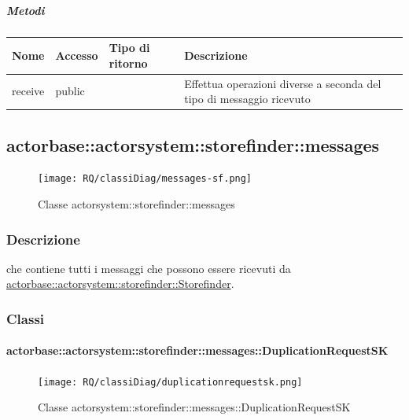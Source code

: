 \documentclass{scalatekids-article}
\begin{document}
\subparagraph{Metodi}

\begin{tabular}{| l | l | l | l |}
  \hline
  Nome & Accesso & Tipo di ritorno & Descrizione\\
  \hline
  receive & public &  & Effettua operazioni diverse a seconda del tipo di messaggio ricevuto\\
  \hline
\end{tabular}

\subsection{actorbase::actorsystem::storefinder::messages}
\label{sec:actorbase::actorsystem::storefinder::messages}

\begin{figure}[H]
  \begin{center}
    \texttt{[image: RQ/classiDiag/messages-sf.png]}
    \caption{Classe actorsystem::storefinder::messages}
  \end{center}
\end{figure}

\subsubsection{Descrizione}

 che contiene tutti i messaggi che possono essere ricevuti da
\hyperref[sec:actorbase::actorsystem::storefinder::Storefinder]{actorbase::actorsystem::storefinder::Storefinder}.

\subsubsection{Classi}

\paragraph{actorbase::actorsystem::storefinder::messages::DuplicationRequestSK}
\label{sec:actorbase::actorsystem::storefinder::messages::DuplicationRequestSK}

\begin{figure}[H]
  \begin{center}
    \texttt{[image: RQ/classiDiag/duplicationrequestsk.png]}
    \caption{Classe actorsystem::storefinder::messages::DuplicationRequestSK}
  \end{center}
\end{figure}
\end{document}
